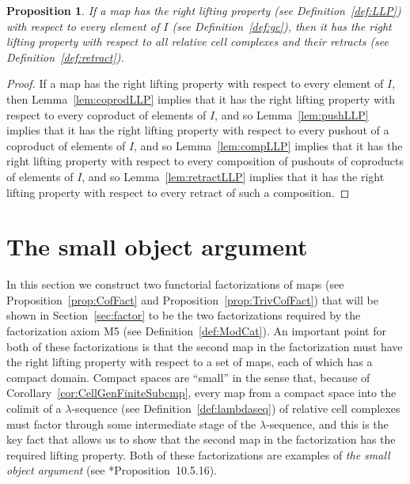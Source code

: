 \documentclass[12pt]{amsart}
\numberwithin{equation}{section}
\theoremstyle{slplain}
\newtheorem{prop}[equation]{Proposition}
\theoremstyle{definition}
\theoremstyle{remark}
\newcommand{\propref}{Proposition~\ref}
\newcommand{\lemref}{Lemma~\ref}
\newcommand{\defref}{Definition~\ref}
\newcommand{\secref}{Section~\ref}
\begin{document}
\begin{prop}
  \label{prop:ClCmpLift}
  If a map has the right lifting property (see \defref{def:LLP}) with
  respect to every element of $I$ (see \defref{def:gc}), then it has
  the right lifting property with respect to all relative cell
  complexes and their retracts (see \defref{def:retract}).
\end{prop}

\begin{proof}
  If a map has the right lifting property with respect to every
  element of $I$, then \lemref{lem:coprodLLP} implies that it has the
  right lifting property with respect to every coproduct of elements
  of $I$, and so \lemref{lem:pushLLP} implies that it has the right
  lifting property with respect to every pushout of a coproduct of
  elements of $I$, and so \lemref{lem:compLLP} implies that it has the
  right lifting property with respect to every composition of pushouts
  of coproducts of elements of $I$, and so \lemref{lem:retractLLP}
  implies that it has the right lifting property with respect to every
  retract of such a composition.
\end{proof}

\section{The small object argument}
\label{sec:SmObj}

In this section we construct two functorial factorizations of maps
(see \propref{prop:CofFact} and \propref{prop:TrivCofFact}) that will
be shown in \secref{sec:factor} to be the two factorizations required
by the factorization axiom M5 (see \defref{def:ModCat}).  An important
point for both of these factorizations is that the second map in the
factorization must have the right lifting property with respect to a
set of maps, each of which has a compact domain.  Compact spaces are
``small'' in the sense that, because of
Corollary~\ref{cor:CellGenFiniteSubcmp}, every map from a compact
space into the colimit of a $\lambda$-sequence (see
\defref{def:lambdaseq}) of relative cell complexes must factor through
some intermediate stage of the $\lambda$-sequence, and this is the key
fact that allows us to show that the second map in the factorization
has the required lifting property.  Both of these factorizations are
examples of \emph{the small object argument} (see
\cite{MCATL}*{Proposition~10.5.16}).
\end{document}
